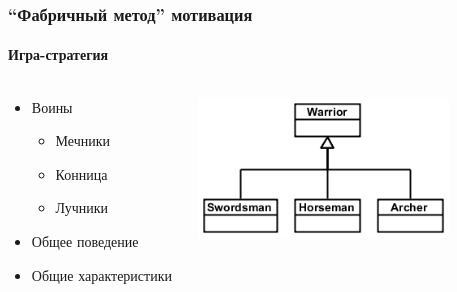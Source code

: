 \documentclass[xetex,mathserif,serif]{beamer}
\begin{document}
	\begin{frame}
		\frametitle{``Фабричный метод'' мотивация}
		\framesubtitle{Игра-стратегия}
		\begin{columns}
			\begin{column}{0.5\textwidth}
				\begin{itemize}
					\item Воины
					\begin{itemize}
						\item Мечники
						\item Конница
						\item Лучники
					\end{itemize}
					\item Общее поведение
					\item Общие характеристики
				\end{itemize}
			\end{column}
			\begin{column}{0.5\textwidth}
				\begin{center}
					\includegraphics[width=0.8\textwidth]{warriors.png}
				\end{center}
			\end{column}
		\end{columns}
	\end{frame}
\end{document}

